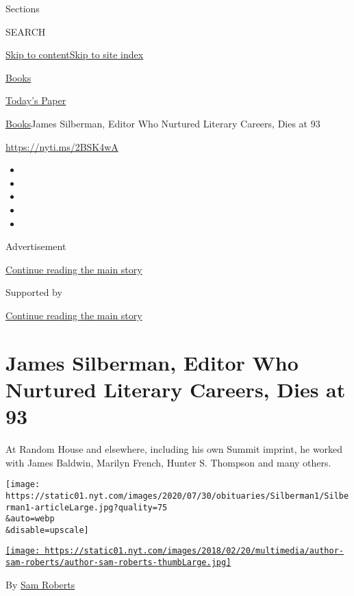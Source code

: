 Sections

SEARCH

\protect\hyperlink{site-content}{Skip to
content}\protect\hyperlink{site-index}{Skip to site index}

\href{https://www.nytimes.com/section/books}{Books}

\href{https://myaccount.nytimes.com/auth/login?response_type=cookie\&client_id=vi}{}

\href{https://www.nytimes.com/section/todayspaper}{Today's Paper}

\href{/section/books}{Books}\textbar{}James Silberman, Editor Who
Nurtured Literary Careers, Dies at 93

\url{https://nyti.ms/2BSK4wA}

\begin{itemize}
\item
\item
\item
\item
\item
\end{itemize}

Advertisement

\protect\hyperlink{after-top}{Continue reading the main story}

Supported by

\protect\hyperlink{after-sponsor}{Continue reading the main story}

\hypertarget{james-silberman-editor-who-nurtured-literary-careers-dies-at-93}{%
\section{James Silberman, Editor Who Nurtured Literary Careers, Dies at
93}\label{james-silberman-editor-who-nurtured-literary-careers-dies-at-93}}

At Random House and elsewhere, including his own Summit imprint, he
worked with James Baldwin, Marilyn French, Hunter S. Thompson and many
others.

\texttt{[image: https://static01.nyt.com/images/2020/07/30/obituaries/Silberman1/Silberman1-articleLarge.jpg?quality=75\\\&auto=webp\\\&disable=upscale]}

\href{https://www.nytimes.com/by/sam-roberts}{\texttt{[image: https://static01.nyt.com/images/2018/02/20/multimedia/author-sam-roberts/author-sam-roberts-thumbLarge.jpg]}}

By \href{https://www.nytimes.com/by/sam-roberts}{Sam Roberts}

